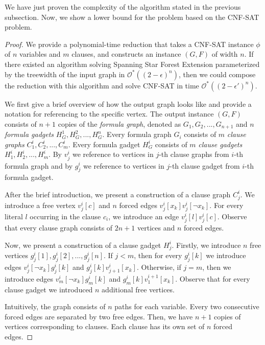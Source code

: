 \documentclass[en]{pracamgr}
\theoremstyle{definition}
\newcommand{\ssfep}{{\sc Spanning Star Forest Extension}}
\newcommand{\cnfsat}{{\sc CNF-SAT}}
\begin{document}
We have just proven the complexity of the algorithm stated in the previous subsection. Now, we show a lower bound for the problem based on the \cnfsat{} problem.

\thmssfeptwseth*

\begin{proof}
	We provide a polynomial-time reduction that takes a \cnfsat{} instance $\phi$ of $n$ variables and $m$ clauses, and constructs an instance $(G,F)$ of width $n$. If there existed an algorithm solving \ssfep{} parameterized by the treewidth of the input graph in $\mathcal{O}^*((2-\epsilon)^n)$, then we could compose the reduction with this algorithm and solve \cnfsat{} in time  $\mathcal{O}^*((2-\epsilon')^n)$.
	
	We first give a brief overview of how the output graph looks like and provide a notation for referencing to the specific vertex. The output instance $(G,F)$ consists of $n+1$ copies of the \textit{formula graph}, denoted as $G_1,G_2,...,G_{n+1}$ and $n$ \textit{formula gadgets} $H^1_G,H^2_G,...,H^n_G$. Every formula graph $G_i$ consists of $m$ \textit{clause graphs} $C^i_1,C^i_2,...,C^i_m$. Every formula gadget $H^i_G$ consists of $m$ \textit{clause gadgets} $H^i_1,H^i_2,...,H^i_m$. By $v^i_j$ we reference to vertices in $j$-th clause graphs from $i$-th formula graph and by $g^i_j$ we reference to vertices in $j$-th clause gadget from $i$-th formula gadget.
	
	After the brief introduction, we present a construction of a clause graph $C^i_j$. We introduce a free vertex $v^i_j[c]$ and $n$ forced edges $v^i_j[x_k]v^i_j[\neg x_k]$. For every literal $l$ occurring in the clause $c_i$, we introduce an edge $v^i_j[l]v^i_j[c]$. Observe that every clause graph consists of $2n+1$ vertices and $n$ forced edges.
	
	Now, we present a construction of a clause gadget $H^i_j$. Firstly, we introduce $n$ free vertices $g^i_j[1],g^i_j[2],...,g^i_j[n]$. If $j < m$, then for every $g^i_j[k]$ we introduce edges $v^i_j[\neg x_k]g^i_j[k]$ and $g^i_j[k]v^i_{j+1}[x_k]$. Otherwise, if $j=m$, then we introduce edges $v^i_m[\neg x_k]g^i_m[k]$ and $g^i_m[k]v^{i+1}_1[x_k]$. Observe that for every clause gadget we introduced $n$ additional free vertices.
	
	Intuitively, the graph consists of $n$ paths for each variable. Every two consecutive forced edges are separated by two free edges. Then, we have $n+1$ copies of vertices corresponding to clauses. Each clause has its own set of $n$ forced edges. 
	

\end{proof}
\end{document}

